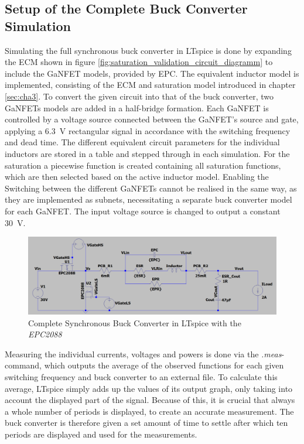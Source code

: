 \subsection{Setup of the Complete Buck Converter Simulation}
Simulating the full synchronous buck converter in LTspice is done by expanding the \ac{ECM} shown in figure \ref{fig:saturation_validation_circuit_diagramm} to include the GaNFET models, provided by EPC. The equivalent inductor model is implemented, consisting of the \ac{ECM} and saturation model introduced in chapter \ref{sec:cha3}.
To convert the given circuit into that of the buck converter, two \acp{GaNFET} models are added in a half-bridge formation. Each \ac{GaNFET} is controlled by a voltage source connected between the \ac{GaNFET}'s source and gate, applying a \SI{6.3}{\V} rectangular signal in accordance with the switching frequency and dead time. 
The different equivalent circuit parameters for the individual inductors are stored in a table and stepped through in each simulation. For the saturation a piecewise function is created containing all saturation functions, which are then selected based on the active inductor model. Enabling the Switching between the different \acp{GaNFET} cannot be realised in the same way, as they are implemented as subnets, necessitating a separate buck converter model for each \ac{GaNFET}. The input voltage source is changed to output a constant \SI{30}{\V}.
\begin{figure}[H]
    \centering
    \includegraphics[width=1\linewidth]{Bilder//Kapitel4/BC_LTspice.png}
    \caption{Complete Synchronous Buck Converter in LTspice with the \textit{EPC2088}}
    \label{fig:BC_LTspice}
\end{figure}
Measuring the individual currents, voltages and powers is done via the \textit{.meas}-command, which outputs the average of the observed functions for each given switching frequency and buck converter to an external file. To calculate this average, LTspice simply adds up the values of its output graph, only taking into account the displayed part of the signal. Because of this, it is crucial that always a whole number of periods is displayed, to create an accurate measurement. The buck converter is therefore given a set amount of time to settle after which ten periods are displayed and used for the measurements. 